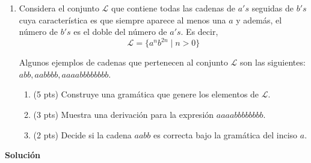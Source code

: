 \documentclass[11pt,letterpaper]{article}
\begin{document}
\begin{enumerate}
    \item Considera el conjunto $\mathcal{L}$ que contiene todas las cadenas de
    $a's$ seguidas de $b's$ cuya característica es que siempre aparece al menos
    una $a$ y además, el número de $b's$ es el doble del número de $a's$. Es decir,
        \begin{equation*}
            \mathcal{L} = \{ a^n b^{2n} \mid n > 0\}
        \end{equation*}

    Algunos ejemplos de cadenas que pertenecen al conjunto $\mathcal{L}$ son las
    siguientes: $abb, aabbbb, aaaabbbbbbbb$.

    \begin{enumerate}
        \item (5 pts) Construye una gramática que genere los elementos de $\mathcal{L}$.
        \item (3 pts) Muestra una derivación para la expresión $aaaabbbbbbbb$.
        \item (2 pts) Decide si la cadena $aabb$ es correcta bajo la gramática
        del inciso $a$.
    \end{enumerate}

\end{enumerate}

{\large \bfseries Solución \par}
\end{document}
